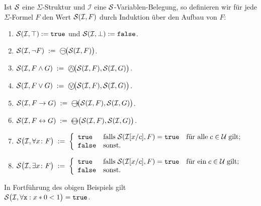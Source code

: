 \begin{Definition}
    Ist $\mathcal{S}$ eine $\Sigma$-Struktur und $\mathcal{I}$ eine $\mathcal{S}$-Variablen-Belegung,
    so definieren wir f\"{u}r jede $\Sigma$-Formel $F$ den Wert $\mathcal{S}(\mathcal{I},F)$
    durch Induktion \"{u}ber den Aufbau von $F$:
    \begin{enumerate}
    \item $\mathcal{S}(\mathcal{I},\top) := \mathtt{true}$ und $\mathcal{S}(\mathcal{I},\bot) := \mathtt{false}$.
    \item $\struct(\mathcal{I}, \neg F) \;:=\; \circneg\bigl(\struct(\mathcal{I}, F)\bigr)$.
    \item $\struct(\mathcal{I}, F \wedge G) \;:=\; \circwedge\bigl(\struct(\mathcal{I}, F), \struct(\mathcal{I}, G)\bigr)$.
    \item $\struct(\mathcal{I}, F \vee G) \;:=\; \circvee\bigl(\struct(\mathcal{I}, F), \struct(\mathcal{I}, G)\bigr)$.
    \item $\struct(\mathcal{I}, F \rightarrow G) \;:=\; \circright\!\bigl(\struct(\mathcal{I}, F), \struct(\mathcal{I}, G)\bigr)$.
    \item $\struct(\mathcal{I}, F \leftrightarrow G) \;:=\; \circleftright\bigl(\struct(\mathcal{I}, F), \struct(\mathcal{I}, G)\bigr)$.
    \item $\mathcal{S}\bigl(\mathcal{I}, \forall x\colon F\bigr) \;:=\; \left\{
      \begin{array}{ll}
         \mathtt{true}  & \mbox{falls}\; \mathcal{S}(\mathcal{I}[x/c], F) = \mathtt{true}\quad \mbox{f\"{u}r alle}\; c\in \mathcal{U}\;\mbox{gilt}; \\
         \mathtt{false} & \mbox{sonst}.
      \end{array}
      \right.$
    \item $\mathcal{S}\bigl(\mathcal{I}, \exists x \colon F\bigr) \;:=\; \left\{
      \begin{array}{ll}
         \mathtt{true}  & \mbox{falls}\; \mathcal{S}(\mathcal{I}[x/c], F) = \mathtt{true}\quad \mbox{f\"{u}r ein}\; c\in \mathcal{U}\;\mbox{gilt}; \\
         \mathtt{false} & \mbox{sonst}.
      \end{array}
      \right.$\eox    
    \end{enumerate}
\end{Definition}

\example
In Fortf\"{u}hrung des obigen Beispiels gilt \\[0.2cm]
\hspace*{1.3cm}  $\mathcal{S}\bigl(\mathcal{I}, \forall \mathtt{x}: x *  0 < 1 \bigr) = \mathtt{true}$.
\eox

